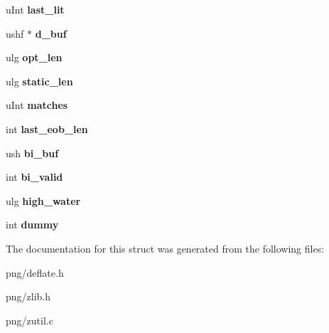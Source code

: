 \begin{DoxyCompactItemize}
\item 
u\+Int {\bfseries last\+\_\+lit}\hypertarget{structinternal__state_a01689001a8f8c7dfa46a439b7ae0708a}{}\label{structinternal__state_a01689001a8f8c7dfa46a439b7ae0708a}

\item 
ushf $\ast$ {\bfseries d\+\_\+buf}\hypertarget{structinternal__state_ac636c34c1c08dc9d2f9c199ce2caa99d}{}\label{structinternal__state_ac636c34c1c08dc9d2f9c199ce2caa99d}

\item 
ulg {\bfseries opt\+\_\+len}\hypertarget{structinternal__state_a2f6efee5d2057aba8bca2c1a58cf418a}{}\label{structinternal__state_a2f6efee5d2057aba8bca2c1a58cf418a}

\item 
ulg {\bfseries static\+\_\+len}\hypertarget{structinternal__state_a8a83e269866761afa3a7b4641ba5ff91}{}\label{structinternal__state_a8a83e269866761afa3a7b4641ba5ff91}

\item 
u\+Int {\bfseries matches}\hypertarget{structinternal__state_ac0f10ec7237615f6b632f2f4d14872ef}{}\label{structinternal__state_ac0f10ec7237615f6b632f2f4d14872ef}

\item 
int {\bfseries last\+\_\+eob\+\_\+len}\hypertarget{structinternal__state_abf71c5672f4fce10f6f6a99eb30f72e1}{}\label{structinternal__state_abf71c5672f4fce10f6f6a99eb30f72e1}

\item 
ush {\bfseries bi\+\_\+buf}\hypertarget{structinternal__state_a6880946d081053778f5f544b04603d13}{}\label{structinternal__state_a6880946d081053778f5f544b04603d13}

\item 
int {\bfseries bi\+\_\+valid}\hypertarget{structinternal__state_a241f3606e41a3aa0ef22868a41bd9a0f}{}\label{structinternal__state_a241f3606e41a3aa0ef22868a41bd9a0f}

\item 
ulg {\bfseries high\+\_\+water}\hypertarget{structinternal__state_a85439cd585435b2590039339139d25cb}{}\label{structinternal__state_a85439cd585435b2590039339139d25cb}

\item 
int {\bfseries dummy}\hypertarget{structinternal__state_ab000a3e3c901dd063859521988ad7e52}{}\label{structinternal__state_ab000a3e3c901dd063859521988ad7e52}

\end{DoxyCompactItemize}


The documentation for this struct was generated from the following files\+:\begin{DoxyCompactItemize}
\item 
png/deflate.\+h\item 
png/zlib.\+h\item 
png/zutil.\+c\end{DoxyCompactItemize}
